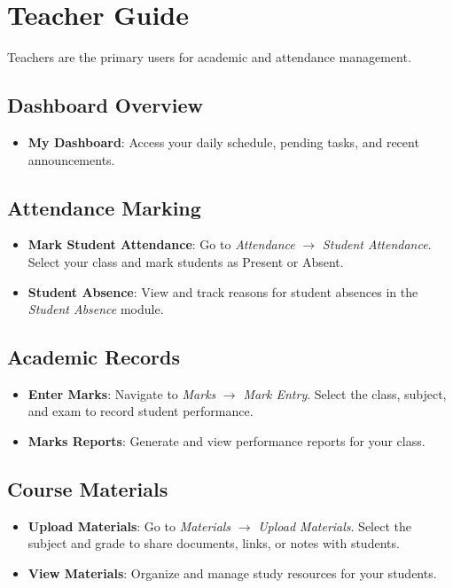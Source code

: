 \documentclass[12pt, a4paper]{report}
\begin{document}
\chapter{Teacher Guide}
Teachers are the primary users for academic and attendance management.

\section{Dashboard Overview}
\begin{itemize}
    \item \textbf{My Dashboard}: Access your daily schedule, pending tasks, and recent announcements.
\end{itemize}

\section{Attendance Marking}
\begin{itemize}
    \item \textbf{Mark Student Attendance}: Go to \textit{Attendance} $\rightarrow$ \textit{Student Attendance}. Select your class and mark students as Present or Absent.
    \item \textbf{Student Absence}: View and track reasons for student absences in the \textit{Student Absence} module.
\end{itemize}

\section{Academic Records}
\begin{itemize}
    \item \textbf{Enter Marks}: Navigate to \textit{Marks} $\rightarrow$ \textit{Mark Entry}. Select the class, subject, and exam to record student performance.
    \item \textbf{Marks Reports}: Generate and view performance reports for your class.
\end{itemize}

\section{Course Materials}
\begin{itemize}
    \item \textbf{Upload Materials}: Go to \textit{Materials} $\rightarrow$ \textit{Upload Materials}. Select the subject and grade to share documents, links, or notes with students.
    \item \textbf{View Materials}: Organize and manage study resources for your students.
\end{itemize}
\end{document}
